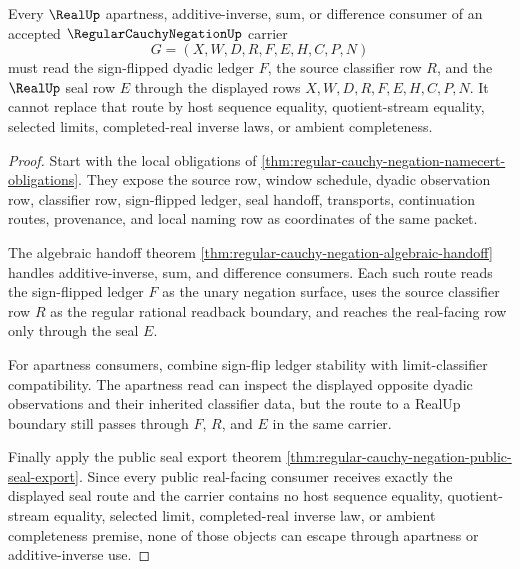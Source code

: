 \begin{theorem}
\label{thm:regular-cauchy-negation-apartness-nonescape}
Every $\RealUp$ apartness, additive-inverse, sum, or difference consumer of an accepted $\RegularCauchyNegationUp$ carrier
$$
G=(X,W,D,R,F,E,H,C,P,N)
$$
must read the sign-flipped dyadic ledger $F$, the source classifier row $R$, and the $\RealUp$ seal row $E$ through the displayed rows $X,W,D,R,F,E,H,C,P,N$. It cannot replace that route by host sequence equality, quotient-stream equality, selected limits, completed-real inverse laws, or ambient completeness.
\end{theorem}
\begin{proof}
Start with the local obligations of \autoref{thm:regular-cauchy-negation-namecert-obligations}. They expose the source row, window schedule, dyadic observation row, classifier row, sign-flipped ledger, seal handoff, transports, continuation routes, provenance, and local naming row as coordinates of the same packet.

The algebraic handoff theorem \autoref{thm:regular-cauchy-negation-algebraic-handoff} handles additive-inverse, sum, and difference consumers. Each such route reads the sign-flipped ledger $F$ as the unary negation surface, uses the source classifier row $R$ as the regular rational readback boundary, and reaches the real-facing row only through the seal $E$.

For apartness consumers, combine sign-flip ledger stability with limit-classifier compatibility. The apartness read can inspect the displayed opposite dyadic observations and their inherited classifier data, but the route to a RealUp boundary still passes through $F$, $R$, and $E$ in the same carrier.

Finally apply the public seal export theorem \autoref{thm:regular-cauchy-negation-public-seal-export}. Since every public real-facing consumer receives exactly the displayed seal route and the carrier contains no host sequence equality, quotient-stream equality, selected limit, completed-real inverse law, or ambient completeness premise, none of those objects can escape through apartness or additive-inverse use.
\end{proof}

